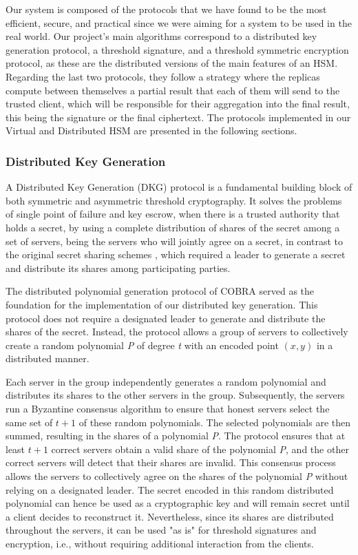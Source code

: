 \documentclass[runningheads]{llncs}
\begin{document}
Our system is composed of the protocols that we have found to be the most efficient, secure, and practical since we were aiming for a system to be used in the real world. Our project's main algorithms correspond to a distributed key generation protocol, a threshold signature, and a threshold symmetric encryption protocol, as these are the distributed versions of the main features of an HSM. Regarding the last two protocols, they follow a strategy where the replicas compute between themselves a partial result that each of them will send to the trusted client, which will be responsible for their aggregation into the final result, this being the signature or the final ciphertext. The protocols implemented in our Virtual and Distributed HSM are presented in the following sections.

\subsubsection{Distributed Key Generation} \label{subsec:distributedkeygen}

A Distributed Key Generation (DKG) protocol is a fundamental building block of both symmetric and asymmetric threshold cryptography. It solves the problems of single point of failure and key escrow, when there is a trusted authority that holds a secret, by using a complete distribution of shares of the secret among a set of servers, being the servers who will jointly agree on a secret, in contrast to the original secret sharing schemes \cite{shamir}, which required a leader to generate a secret and distribute its shares among participating parties.

The distributed polynomial generation protocol of COBRA \cite{cobra} served as the foundation for the implementation of our distributed key generation. This protocol does not require a designated leader to generate and distribute the shares of the secret. Instead, the protocol allows a group of servers to collectively create a random polynomial \textit{P} of degree \textit{t} with an encoded point $(x, y)$ in a distributed manner. 

Each server in the group independently generates a random polynomial and distributes its shares to the other servers in the group. Subsequently, the servers run a Byzantine consensus algorithm to ensure that honest servers select the same set of $t + 1$ of these random polynomials. The selected polynomials are then summed, resulting in the shares of a polynomial \textit{P}. The protocol ensures that at least $t + 1$ correct servers obtain a valid share of the polynomial \textit{P}, and the other correct servers will detect that their shares are invalid. This consensus process allows the servers to collectively agree on the shares of the polynomial \textit{P} without relying on a designated leader. The secret encoded in this random distributed polynomial can hence be used as a cryptographic key and will remain secret until a client decides to reconstruct it. Nevertheless, since its shares are distributed throughout the servers, it can be used "as is" for threshold signatures and encryption, i.e., without requiring additional interaction from the clients.
\end{document}

